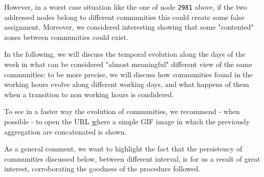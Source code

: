 \documentclass[12pt,a4paper]{article}
\begin{document}
However, in a worst case situation like the one of node \texttt{2981} above, if the two addressed nodes belong to different communities this could create some false assignment. Moreover, we considered interesting showing that some "contented" zones between communities could exist.

In the following, we will discuss the temporal evolution along the days of the week in what can be considered "almost meaningful" different view of the same communities: to be more precise, we will discuss how communities found in the working hours evolve along different working days, and what happens of them when a transition to non working hours is condidered.

To see in a faster way the evolution of communities, we recommend - when possible - to open the URL \href{http://s8.postimg.org/4cscwraxh/Week.gif} where a simple GIF image in which the previously aggregation are concatenated is shown.

As a general comment, we want to highlight the fact that the persistency of communities discussed below, between different interval, is for us a result of great interest, corroborating the goodness of the procedure followed.
\end{document}

